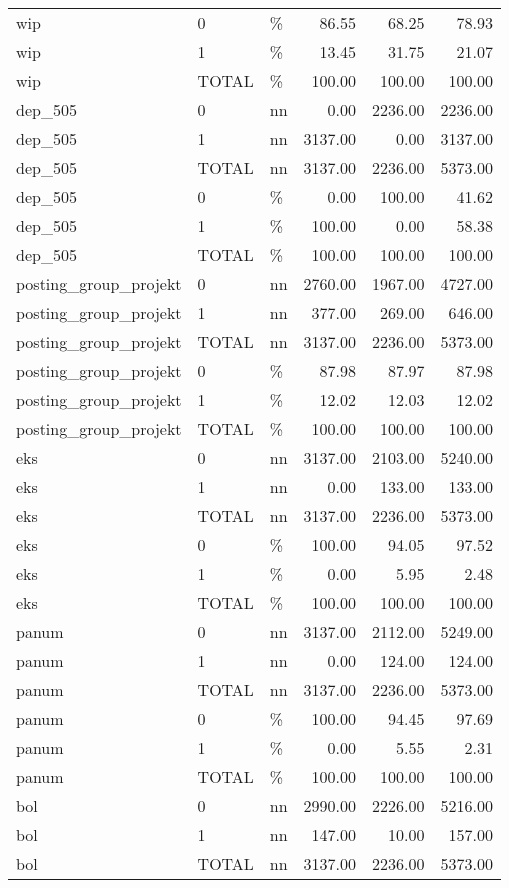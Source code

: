 \begin{longtable}[t]{lllrrr}
wip & 0 & \% & 86.55 & 68.25 & 78.93\\
wip & 1 & \% & 13.45 & 31.75 & 21.07\\
wip & TOTAL & \% & 100.00 & 100.00 & 100.00\\
dep\_505 & 0 & nn & 0.00 & 2236.00 & 2236.00\\
dep\_505 & 1 & nn & 3137.00 & 0.00 & 3137.00\\
dep\_505 & TOTAL & nn & 3137.00 & 2236.00 & 5373.00\\
dep\_505 & 0 & \% & 0.00 & 100.00 & 41.62\\
dep\_505 & 1 & \% & 100.00 & 0.00 & 58.38\\
dep\_505 & TOTAL & \% & 100.00 & 100.00 & 100.00\\
posting\_group\_projekt & 0 & nn & 2760.00 & 1967.00 & 4727.00\\
posting\_group\_projekt & 1 & nn & 377.00 & 269.00 & 646.00\\
posting\_group\_projekt & TOTAL & nn & 3137.00 & 2236.00 & 5373.00\\
posting\_group\_projekt & 0 & \% & 87.98 & 87.97 & 87.98\\
posting\_group\_projekt & 1 & \% & 12.02 & 12.03 & 12.02\\
posting\_group\_projekt & TOTAL & \% & 100.00 & 100.00 & 100.00\\
eks & 0 & nn & 3137.00 & 2103.00 & 5240.00\\
eks & 1 & nn & 0.00 & 133.00 & 133.00\\
eks & TOTAL & nn & 3137.00 & 2236.00 & 5373.00\\
eks & 0 & \% & 100.00 & 94.05 & 97.52\\
eks & 1 & \% & 0.00 & 5.95 & 2.48\\
eks & TOTAL & \% & 100.00 & 100.00 & 100.00\\
panum & 0 & nn & 3137.00 & 2112.00 & 5249.00\\
panum & 1 & nn & 0.00 & 124.00 & 124.00\\
panum & TOTAL & nn & 3137.00 & 2236.00 & 5373.00\\
panum & 0 & \% & 100.00 & 94.45 & 97.69\\
panum & 1 & \% & 0.00 & 5.55 & 2.31\\
panum & TOTAL & \% & 100.00 & 100.00 & 100.00\\
bol & 0 & nn & 2990.00 & 2226.00 & 5216.00\\
bol & 1 & nn & 147.00 & 10.00 & 157.00\\
bol & TOTAL & nn & 3137.00 & 2236.00 & 5373.00\\

\end{longtable}
